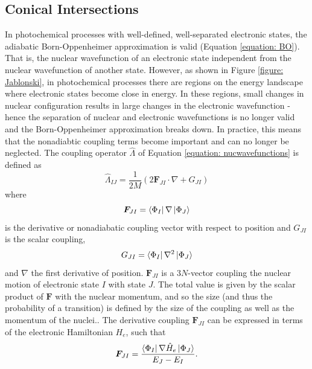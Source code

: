 \subsection{Conical Intersections} \label{section: photo_conicals}
In photochemical processes with well-defined, well-separated electronic states, the adiabatic Born-Oppenheimer approximation is valid (Equation \ref{equation: BO}). That is, the nuclear wavefunction of an electronic state independent from the nuclear wavefunction of another state. However, as shown in Figure \ref{figure: Jablonski}, in photochemical processes there are regions on the energy landscape where electronic states become close in energy. In these regions, small changes in nuclear configuration results in large changes in the electronic wavefunction - hence the separation of nuclear and electronic wavefunctions is no longer valid and the Born-Oppenheimer approximation breaks down. In practice, this means that the nonadiabtic coupling terms become important and can no longer be neglected. The coupling operator $\hat{\Lambda}$ of Equation \ref{equation: nucwavefunctions} is defined as
\begin{equation}
    \hat{\Lambda}_{IJ}=\frac{1}{2M}(2\bm{F}_{JI}\cdot{}\nabla{}+G_{JI})
\end{equation}
where 
\begin{equation}
    \bm{F}_{JI}=\bra{\Phi_{I}}\nabla{}\ket{\Phi_{J}}
\end{equation}
is the derivative or nonadiabatic coupling vector with respect to position and $G_{JI}$ is the scalar coupling,
\begin{equation}
    G_{JI}=\bra{\Phi_{I}}\nabla{}^{2}\ket{\Phi_{J}}
\end{equation}
and $\nabla$ the first derivative of position. $\bm{F}_{JI}$ is a 3$N$-vector coupling the nuclear motion of electronic state $I$ with state $J$. The total value is given by the scalar product of $\bm{F}$ with the nuclear momentum, and so the size (and thus the probability of a transition) is defined by the size of the coupling as well as the momentum of the nuclei.\cite{Worth2004}. The derivative coupling $\bm{F}_{JI}$ can be expressed in terms of the electronic Hamiltonian $H_{e}$, such that
\begin{equation}\label{equation: NAC_F}
        \bm{F}_{JI}=\frac{\bra{\Phi_{I}}\nabla{}\hat{H}_{e}\ket{\Phi_{J}}}{E_{J}-E_{I}}.
\end{equation}

